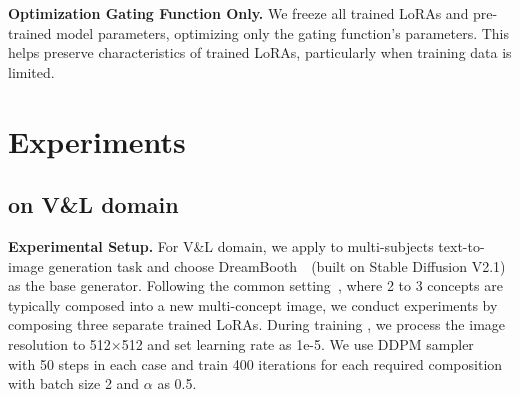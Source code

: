 \noindent\textbf{Optimization Gating Function Only.}
We freeze all trained LoRAs and pre-trained model parameters, optimizing only the gating function's parameters. This helps preserve characteristics of trained LoRAs, particularly when training data is limited.

\section{Experiments}
\label{sec:experiment}
\subsection{\our{} on V\&L domain}
\noindent\textbf{Experimental Setup.} For V\&L domain, we apply \our{} to multi-subjects text-to-image generation task and choose DreamBooth~\citep{ruiz2023dreambooth}~(built on Stable Diffusion V2.1) as the base generator. 
Following the common setting~\citep{han2023svdiff, TI}, where 2 to 3 concepts are typically composed into a new multi-concept image, we conduct experiments by composing three separate trained LoRAs.
During training \our, we process the image resolution to 512$\times$512 and set learning rate as 1e-5. We use DDPM sampler~\citep{DDPM} with 50 steps in each case and train 400 iterations for each required composition with batch size 2 and $\alpha$ as 0.5.

